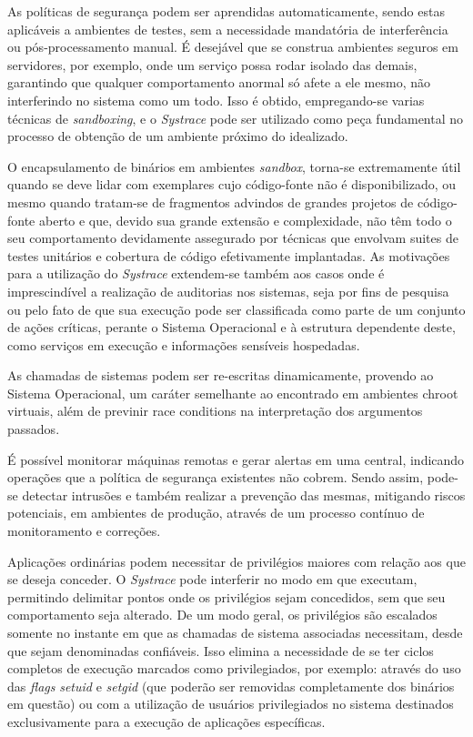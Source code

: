 As políticas de segurança podem ser aprendidas automaticamente, sendo estas aplicáveis a ambientes de testes, sem a necessidade mandatória de interferência ou pós-processamento manual. É desejável que se construa ambientes seguros em servidores, por exemplo, onde um serviço possa rodar isolado das demais, garantindo que qualquer comportamento anormal só afete a ele mesmo, não interferindo no sistema como um todo. Isso é obtido, empregando-se varias técnicas de \textit{sandboxing}, e o \textit{Systrace} pode ser utilizado como peça fundamental no processo de obtenção de um ambiente próximo do idealizado.

O encapsulamento de binários em ambientes \textit{sandbox}, torna-se extremamente útil quando se deve lidar com exemplares cujo código-fonte não é disponibilizado, ou mesmo quando tratam-se de fragmentos advindos de grandes projetos de código-fonte aberto e que, devido sua grande extensão e complexidade, não têm todo o seu comportamento devidamente assegurado por técnicas que envolvam suites de testes unitários e cobertura de código efetivamente implantadas. As motivações para a utilização do \textit{Systrace} extendem-se também aos casos onde é imprescindível a realização de auditorias nos sistemas, seja por fins de pesquisa ou pelo fato de que sua execução pode ser classificada como parte de um conjunto de ações críticas, perante o Sistema Operacional e à estrutura dependente deste, como serviços em execução e informações sensíveis hospedadas.

As chamadas de sistemas podem ser re-escritas dinamicamente, provendo ao Sistema Operacional, um caráter semelhante ao encontrado em ambientes chroot virtuais, além de previnir race conditions na interpretação dos argumentos passados\cite{RACEARGS}.

É possível monitorar máquinas remotas e gerar alertas em uma central, indicando operações que a política de segurança existentes não cobrem. Sendo assim, pode-se detectar intrusões e também realizar a prevenção das mesmas, mitigando riscos potenciais, em ambientes de produção, através de um processo contínuo de monitoramento e correções.

Aplicações ordinárias podem necessitar de privilégios maiores com relação aos que se deseja conceder. O \textit{Systrace} pode interferir no modo em que executam, permitindo delimitar pontos onde os privilégios sejam concedidos, sem que seu comportamento seja alterado. De um modo geral, os privilégios são escalados somente no instante em que as chamadas de sistema associadas necessitam, desde que sejam denominadas confiáveis. Isso elimina a necessidade de se ter ciclos completos de execução marcados como privilegiados, por exemplo: através do uso das \textit{flags} \textit{setuid} e \textit{setgid} (que poderão ser removidas completamente dos binários em questão) ou com a utilização de usuários privilegiados no sistema destinados exclusivamente para a execução de aplicações específicas.


